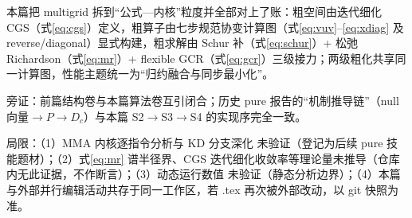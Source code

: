 \documentclass[UTF8]{ctexart}
\begin{document}
\begin{conclbox}
本篇把 multigrid 拆到``公式—内核''粒度并全部对上了账：粗空间由迭代细化 CGS（式\eqref{eq:cgs}）定义，粗算子由七步规范协变计算图（式\eqref{eq:vuv}--\eqref{eq:xdiag} 及 reverse/diagonal）显式构建，粗求解由 Schur 补（式\eqref{eq:schur}）+ 松弛 Richardson（式\eqref{eq:mr}）+ flexible GCR（式\eqref{eq:gcr}）三级接力；两级粗化共享同一计算图，性能主题统一为``归约融合与同步最小化''。
\end{conclbox}

\begin{refbox}
旁证：前篇结构卷与本篇算法卷互引闭合；历史 pure 报告的``机制推导链''（null 向量$\to$$P$$\to$$D_c$）与本篇 S2$\to$S3$\to$S4 的实现序完全一致。
\end{refbox}

\begin{warnbox}
局限：（1）MMA 内核逐指令分析与 KD 分支深化 \textcolor{warn}{未验证}（登记为后续 pure 技能题材）；（2）式\eqref{eq:mr} 谱半径界、CGS 迭代细化收敛率等理论量未推导（仓库内无此证据，不作断言）；（3）动态运行数值 \textcolor{warn}{未验证}（静态分析边界）；（4）本篇与外部并行编辑活动共存于同一工作区，若 .tex 再次被外部改动，以 git 快照为准。
\end{warnbox}
\end{document}
